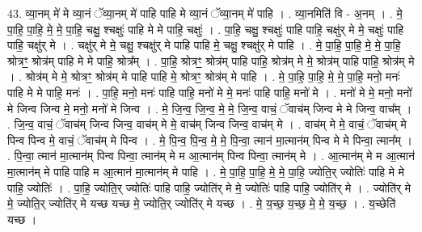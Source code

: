 \documentclass[17pt]{extarticle}
\begin{document}
43. व्या॒नम् मे॑ मे व्या॒नं ॅव्या॒नम् मे॑ पाहि पाहि मे व्या॒नं ॅव्या॒नम् मे॑ पाहि । . व्या॒नमिति॑ वि - अ॒नम् । . मे॒ पा॒हि॒ पा॒हि॒ मे॒ मे॒ पा॒हि॒ चक्षु॒ श्चक्षुः॑ पाहि मे मे पाहि॒ चक्षुः॑ । . पा॒हि॒ चक्षु॒ श्चक्षुः॑ पाहि पाहि॒ चक्षु॑र् मे मे॒ चक्षुः॑ पाहि पाहि॒ चक्षु॑र् मे । . चक्षु॑र् मे मे॒ चक्षु॒ श्चक्षु॑र् मे पाहि पाहि मे॒ चक्षु॒ श्चक्षु॑र् मे पाहि । . मे॒ पा॒हि॒ पा॒हि॒ मे॒ मे॒ पा॒हि॒ श्रोत्रꣳ॒॒ श्रोत्र॑म् पाहि मे मे पाहि॒ श्रोत्र᳚म् । . पा॒हि॒ श्रोत्रꣳ॒॒ श्रोत्र॑म् पाहि पाहि॒ श्रोत्र॑म् मे मे॒ श्रोत्र॑म् पाहि पाहि॒ श्रोत्र॑म् मे । . श्रोत्र॑म् मे मे॒ श्रोत्रꣳ॒॒ श्रोत्र॑म् मे पाहि पाहि मे॒ श्रोत्रꣳ॒॒ श्रोत्र॑म् मे पाहि । . मे॒ पा॒हि॒ पा॒हि॒ मे॒ मे॒ पा॒हि॒ मनो॒ मनः॑ पाहि मे मे पाहि॒ मनः॑ । . पा॒हि॒ मनो॒ मनः॑ पाहि पाहि॒ मनो॑ मे मे॒ मनः॑ पाहि पाहि॒ मनो॑ मे । . मनो॑ मे मे॒ मनो॒ मनो॑ मे जिन्व जिन्व मे॒ मनो॒ मनो॑ मे जिन्व । . मे॒ जि॒न्व॒ जि॒न्व॒ मे॒ मे॒ जि॒न्व॒ वाचं॒ ॅवाच॑म् जिन्व मे मे जिन्व॒ वाच᳚म् । . जि॒न्व॒ वाचं॒ ॅवाच॑म् जिन्व जिन्व॒ वाच॑म् मे मे॒ वाच॑म् जिन्व जिन्व॒ वाच॑म् मे । . वाच॑म् मे मे॒ वाचं॒ ॅवाच॑म् मे पिन्व पिन्व मे॒ वाचं॒ ॅवाच॑म् मे पिन्व । . मे॒ पि॒न्व॒ पि॒न्व॒ मे॒ मे॒ पि॒न्वा॒ त्मान॑ मा॒त्मान॑म् पिन्व मे मे पिन्वा॒ त्मान᳚म् । . पि॒न्वा॒ त्मान॑ मा॒त्मान॑म् पिन्व पिन्वा॒ त्मान॑म् मे म आ॒त्मान॑म् पिन्व पिन्वा॒ त्मान॑म् मे । . आ॒त्मान॑म् मे म आ॒त्मान॑ मा॒त्मान॑म् मे पाहि पाहि म आ॒त्मान॑ मा॒त्मान॑म् मे पाहि । . मे॒ पा॒हि॒ पा॒हि॒ मे॒ मे॒ पा॒हि॒ ज्योति॒र् ज्योतिः॑ पाहि मे मे पाहि॒ ज्योतिः॑ । . पा॒हि॒ ज्योति॒र् ज्योतिः॑ पाहि पाहि॒ ज्योति॑र् मे मे॒ ज्योतिः॑ पाहि पाहि॒ ज्योति॑र् मे । . ज्योति॑र् मे मे॒ ज्योति॒र् ज्योति॑र् मे यच्छ यच्छ मे॒ ज्योति॒र् ज्योति॑र् मे यच्छ । . मे॒ य॒च्छ॒ य॒च्छ॒ मे॒ मे॒ य॒च्छ॒ । . य॒च्छेति॑ यच्छ । \newline
\pagebreak
{}
\end{document}
